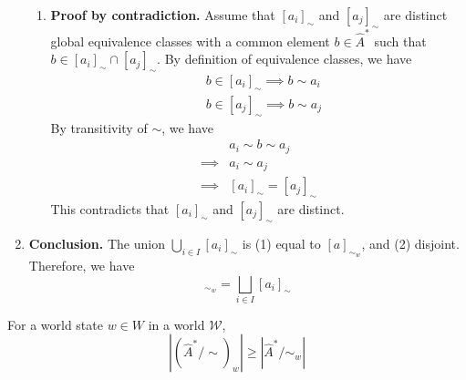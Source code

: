 \begin{proofE}
\begin{enumerate}
\begin{enumerate}
        \item \textbf{Proof by contradiction.}
        Assume that $[a_{i}]_{\sim}$ and $[a_{j}]_{\sim}$ are distinct global equivalence classes with a common element $b \in \hat{A}^{*}$ such that $b \in [a_{i}]_{\sim} \cap [a_{j}]_{\sim}$.
        By definition of equivalence classes, we have
        \begin{align}
            & b \in [a_{i}]_{\sim} \implies b \sim a_{i} \\
            & b \in [a_{j}]_{\sim} \implies b \sim a_{j}
        \end{align}
        By transitivity of $\sim$, we have
        \begin{align}
            & a_{i} \sim b \sim a_{j} \\
            \implies & a_{i} \sim a_{j} \\
            \implies & [a_{i}]_{\sim} = [a_{j}]_{\sim}
        \end{align}
        This contradicts that $[a_{i}]_{\sim}$ and $[a_{j}]_{\sim}$ are distinct.
    \end{enumerate}

    \item \textbf{Conclusion.}
    The union $\bigcup_{i \in I}[a_{i}]_{\sim}$ is (1) equal to $[a]_{\sim_{w}}$, and (2) disjoint.
    Therefore, we have
    \begin{equation}
        [a]_{\sim_{w}} = \bigsqcup_{i \in I}[a_{i}]_{\sim}
    \end{equation}
\end{enumerate}
\end{proofE}

\begin{corollary}
    For a world state $w \in W$ in a world $\mathscr{W}$,
    \begin{equation}
        |(\hat{A}^{*}/\sim)_{w}| \geq | \hat{A}^{*}/\sim_{w}|
    \end{equation}
\end{corollary}





